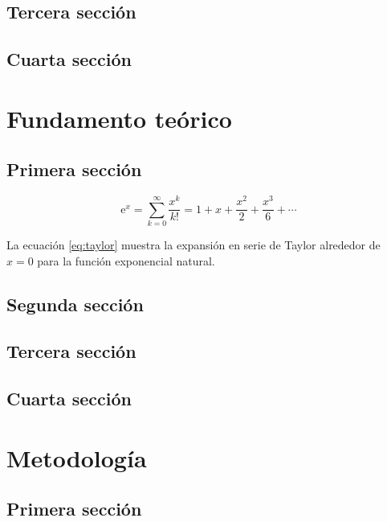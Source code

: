 \documentclass[12pt]{Tesis}
\begin{document}
\section{Tercera sección}
\lipsum[5-6]

\section{Cuarta sección}
\lipsum[7-8]

\chapter{Fundamento teórico}

\section{Primera sección}

\lipsum[1]

\begin{equation}                                                     
\mathrm{e}^{x} = \sum_{k=0}^{\infty} \frac{x^k}{k!} = 
1 + x + \frac{x^2}{2} + \frac{x^3}{6} + \cdots
\label{eq:taylor}
\end{equation}

La ecuación \eqref{eq:taylor} muestra la expansión en serie de Taylor alrededor de $x = 0$ para la función exponencial natural.

\section{Segunda sección}
\lipsum[3-4]

\section{Tercera sección}
\lipsum[5-6]

\section{Cuarta sección}
\lipsum[7-8]

\chapter{Metodología}

\section{Primera sección}
\lipsum[1-2]
\end{document}
